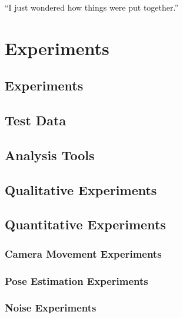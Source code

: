 \begin{savequote}[8cm]
  ``I just wondered how things were put together.''
\end{savequote}
\makeatletter
\chapter{Experiments}

\section{Experiments}

\section{Test Data}

\section{Analysis Tools}

\section{Qualitative Experiments}

\section{Quantitative Experiments}

\subsection{Camera Movement Experiments}

\subsection{Pose Estimation Experiments}

\subsection{Noise Experiments}




